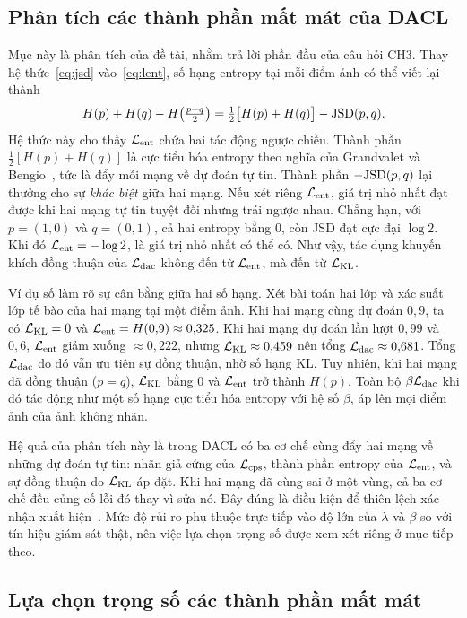 \subsection{Phân tích các thành phần mất mát của DACL}
\label{sec:loss-analysis}

Mục này là phân tích của đề tài, nhằm trả lời phần đầu của câu hỏi CH3. Thay hệ thức~\eqref{eq:jsd} vào~\eqref{eq:lent}, số hạng entropy tại mỗi điểm ảnh có thể viết lại thành
\begin{equation}
  H(p)+H(q)-H\big(\tfrac{p+q}{2}\big)=\tfrac12\big[H(p)+H(q)\big]-\mathrm{JSD}(p,q).
  \label{eq:lent-decomp}
\end{equation}
Hệ thức này cho thấy $\mathcal{L}_{\mathrm{ent}}$ chứa hai tác động ngược chiều. Thành phần $\tfrac12[H(p)+H(q)]$ là cực tiểu hóa entropy theo nghĩa của Grandvalet và Bengio~\cite{grandvalet2005entropy}, tức là đẩy mỗi mạng về dự đoán tự tin. Thành phần $-\mathrm{JSD}(p,q)$ lại thưởng cho sự \emph{khác biệt} giữa hai mạng. Nếu xét riêng $\mathcal{L}_{\mathrm{ent}}$, giá trị nhỏ nhất đạt được khi hai mạng tự tin tuyệt đối nhưng trái ngược nhau. Chẳng hạn, với $p=(1,0)$ và $q=(0,1)$, cả hai entropy bằng 0, còn JSD đạt cực đại $\log 2$. Khi đó $\mathcal{L}_{\mathrm{ent}}=-\log 2$, là giá trị nhỏ nhất có thể có. Như vậy, tác dụng khuyến khích đồng thuận của $\mathcal{L}_{\mathrm{dac}}$ không đến từ $\mathcal{L}_{\mathrm{ent}}$, mà đến từ $\mathcal{L}_{\mathrm{KL}}$.

Ví dụ số làm rõ sự cân bằng giữa hai số hạng. Xét bài toán hai lớp và xác suất lớp tế bào của hai mạng tại một điểm ảnh. Khi hai mạng cùng dự đoán $0{,}9$, ta có $\mathcal{L}_{\mathrm{KL}}=0$ và $\mathcal{L}_{\mathrm{ent}}=H(0{,}9)\approx0{,}325$. Khi hai mạng dự đoán lần lượt $0{,}99$ và $0{,}6$, $\mathcal{L}_{\mathrm{ent}}$ giảm xuống $\approx0{,}222$, nhưng $\mathcal{L}_{\mathrm{KL}}\approx0{,}459$ nên tổng $\mathcal{L}_{\mathrm{dac}}\approx0{,}681$. Tổng $\mathcal{L}_{\mathrm{dac}}$ do đó vẫn ưu tiên sự đồng thuận, nhờ số hạng KL. Tuy nhiên, khi hai mạng đã đồng thuận ($p=q$), $\mathcal{L}_{\mathrm{KL}}$ bằng 0 và $\mathcal{L}_{\mathrm{ent}}$ trở thành $H(p)$. Toàn bộ $\beta\mathcal{L}_{\mathrm{dac}}$ khi đó tác động như một số hạng cực tiểu hóa entropy với hệ số $\beta$, áp lên mọi điểm ảnh của ảnh không nhãn.

Hệ quả của phân tích này là trong DACL có ba cơ chế cùng đẩy hai mạng về những dự đoán tự tin: nhãn giả cứng của $\mathcal{L}_{\mathrm{cps}}$, thành phần entropy của $\mathcal{L}_{\mathrm{ent}}$, và sự đồng thuận do $\mathcal{L}_{\mathrm{KL}}$ áp đặt. Khi hai mạng đã cùng sai ở một vùng, cả ba cơ chế đều củng cố lỗi đó thay vì sửa nó. Đây đúng là điều kiện để thiên lệch xác nhận xuất hiện~\cite{arazo2020pseudo}. Mức độ rủi ro phụ thuộc trực tiếp vào độ lớn của $\lambda$ và $\beta$ so với tín hiệu giám sát thật, nên việc lựa chọn trọng số được xem xét riêng ở mục tiếp theo.

\subsection{Lựa chọn trọng số các thành phần mất mát}
\label{sec:weights}

